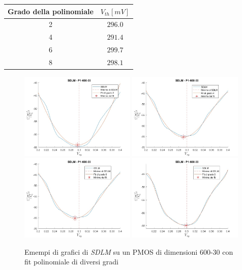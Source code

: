 \documentclass[12pt, letterpaper]{book}
\begin{document}
\begin{center}
\begin{tabular}{| c | c |}
\hline
Grado della polinomiale& $V_{th}[mV]$ \\
\hline
2  & $296.0$ \\
4  & $291.4$ \\
6  & $299.7$ \\
8  & $298.1$ \\
\hline

\end{tabular}
\end{center}

\begin{figure}[h!]
\centering
 \includegraphics[width=0.49\textwidth]{SDLM-P1-600-30-grado2}
 \includegraphics[width=0.49\textwidth]{SDLM-P1-600-30-grado4}
 \includegraphics[width=0.49\textwidth]{SDLM-P1-600-30-grado6}
 \includegraphics[width=0.49\textwidth]{SDLM-P1-600-30-grado8}
 \caption{Emempi di grafici di \emph{SDLM} su un PMOS di dimensioni 600-30 con fit polinomiale di diversi gradi}
\end{figure}
\end{document}
